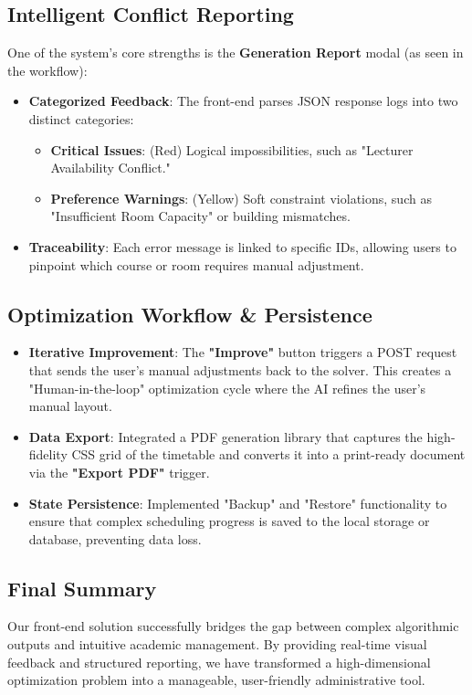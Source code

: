 \documentclass[11pt,a4paper]{article}
\begin{document}
\subsection{Intelligent Conflict Reporting}
One of the system's core strengths is the \textbf{Generation Report} modal (as seen in the workflow):
\begin{itemize}
    \item \textbf{Categorized Feedback}: The front-end parses JSON response logs into two distinct categories: 
        \begin{itemize}
            \item \textbf{Critical Issues}: (Red) Logical impossibilities, such as "Lecturer Availability Conflict."
            \item \textbf{Preference Warnings}: (Yellow) Soft constraint violations, such as "Insufficient Room Capacity" or building mismatches.
        \end{itemize}
    \item \textbf{Traceability}: Each error message is linked to specific IDs, allowing users to pinpoint which course or room requires manual adjustment.
\end{itemize}

\subsection{Optimization Workflow \& Persistence}
\begin{itemize}
    \item \textbf{Iterative Improvement}: The \textbf{"Improve"} button triggers a POST request that sends the user's manual adjustments back to the solver. This creates a "Human-in-the-loop" optimization cycle where the AI refines the user's manual layout.
    \item \textbf{Data Export}: Integrated a PDF generation library that captures the high-fidelity CSS grid of the timetable and converts it into a print-ready document via the \textbf{"Export PDF"} trigger.
    \item \textbf{State Persistence}: Implemented "Backup" and "Restore" functionality to ensure that complex scheduling progress is saved to the local storage or database, preventing data loss.
\end{itemize}

\subsection{Final Summary}
Our front-end solution successfully bridges the gap between complex algorithmic outputs and intuitive academic management. By providing real-time visual feedback and structured reporting, we have transformed a high-dimensional optimization problem into a manageable, user-friendly administrative tool.
\end{document}
